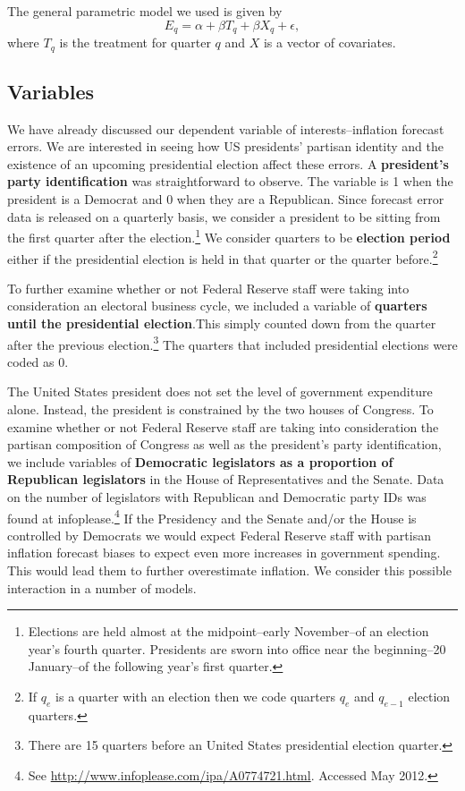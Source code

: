 \documentclass[a4paper]{article}\usepackage{graphicx, color}
\begin{document}
The general parametric model we used is given by
%
\begin{equation}
    E_{q} = \alpha + \beta T_{q} + \beta X_{q} + \epsilon,
\end{equation}
%
where $T_{q}$ is the treatment for quarter $q$ and $X$ is a vector of covariates. 

\subsection{Variables}

We have already discussed our dependent variable of interests--inflation forecast errors. We are interested in seeing how US presidents' partisan identity and the existence of an upcoming presidential election affect these errors. A {\bf{president's party identification}} was straightforward to observe. The variable is 1 when the president is a Democrat and 0 when they are a Republican. Since forecast error data is released on a quarterly basis, we consider a president to be sitting from the first quarter after the election.\footnote{Elections are held almost at the midpoint--early November--of an election year's fourth quarter. Presidents are sworn into office near the beginning--20 January--of the following year's first quarter.} We consider quarters to be {\bf{election period}} either if the presidential election is held in that quarter or the quarter before.\footnote{If $q_{e}$ is a quarter with an election then we code quarters $q_{e}$ and $q_{e-1}$ election quarters.}

To further examine whether or not Federal Reserve staff were taking into consideration an electoral business cycle, we included a variable of {\bf{quarters until the presidential election}}.This simply counted down from the quarter after the previous election.\footnote{There are 15 quarters before an United States presidential election quarter.} The quarters that included presidential elections were coded as 0. 

The United States president does not set the level of government expenditure alone. Instead, the president is constrained by the two houses of Congress. To examine whether or not Federal Reserve staff are taking into consideration the partisan composition of Congress as well as the president's party identification, we include variables of {\bf{Democratic legislators as a proportion of Republican legislators}} in the House of Representatives and the Senate. Data on the number of legislators with Republican and Democratic party IDs was found at infoplease.\footnote{See {\url{http://www.infoplease.com/ipa/A0774721.html}}. Accessed May 2012.} If the Presidency and the Senate and/or the House is controlled by Democrats we would expect Federal Reserve staff with partisan inflation forecast biases to expect even more increases in government spending. This would lead them to further overestimate inflation. We consider this possible interaction in a number of models.
\end{document}
